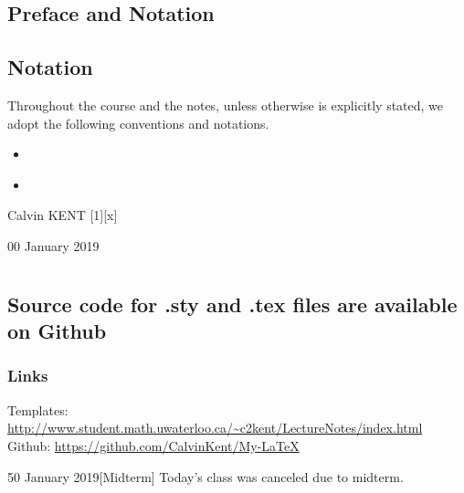 \documentclass[11pt,oneside]{book} %
\begin{document}
	\renewcommand*{\term}{Term 2000} %
	\renewcommand*{\coursecode}{MATH 000} %
	\renewcommand*{\coursename}{Course Name} %
	\renewcommand*{\profname}{Prof Name} %
	\renewcommand*{\colink}{http://www.student.math.uwaterloo.ca/~c2kent} %
	\setfigpath
	\inserttoctitle
	\pagestyle{plain}
	\section*{Preface and Notation}
	\ckpreface
	\section*{Notation}
	Throughout the course and the notes, unless otherwise is explicitly stated, we adopt the following conventions and notations.
	\begin{itemize}
		\item ~
		\item ~
	\end{itemize}
	\hfill Calvin KENT
	\clearpage
	\pagestyle{classlecture}
[1][x]
\begin{lec}{00 January 2019}
	\chapter{\chapname\chaplec}
	\section{Source code for .sty and .tex files are available on Github}
	\subsection{Links}
	Templates: \url{http://www.student.math.uwaterloo.ca/~c2kent/LectureNotes/index.html}\\
	Github: \url{https://github.com/CalvinKent/My-LaTeX}
\end{lec}
\begin{lec}{50 January 2019}[Midterm]
	Today's class was canceled due to midterm.
\end{lec}
\end{document}
